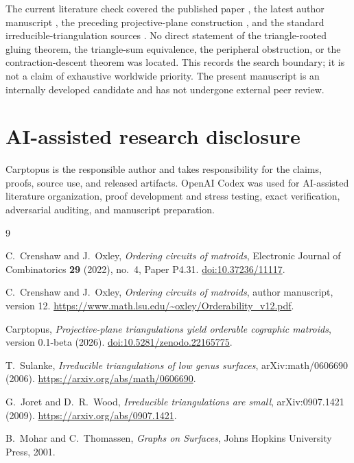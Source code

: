 \documentclass[11pt]{article}
\begin{document}
The current literature check covered the published paper \cite{crenshaw-oxley-published}, the latest
author manuscript \cite{crenshaw-oxley-v12}, the preceding projective-plane construction \cite{carptopus-rp2}, and
the standard irreducible-triangulation sources \cite{sulanke,joret-wood}. No direct statement of
the triangle-rooted gluing theorem, the triangle-sum equivalence, the
peripheral obstruction, or the contraction-descent theorem was located. This
records the search boundary; it is not a claim of exhaustive worldwide
priority. The present manuscript is an internally developed candidate and has
not undergone external peer review.

\Needspace{0.16\textheight}
\section*{AI-assisted research disclosure}


Carptopus is the responsible author and takes responsibility for the claims,
proofs, source use, and released artifacts. OpenAI Codex was used for
AI-assisted literature organization, proof development and stress testing,
exact verification, adversarial auditing, and manuscript preparation.

\begin{thebibliography}{9}
\footnotesize
\raggedright

C.~Crenshaw and J.~Oxley,
\emph{Ordering circuits of matroids},
Electronic Journal of Combinatorics \textbf{29} (2022), no.~4, Paper P4.31.
\href{https://doi.org/10.37236/11117}{doi:10.37236/11117}.

C.~Crenshaw and J.~Oxley,
\emph{Ordering circuits of matroids}, author manuscript, version 12.
\url{https://www.math.lsu.edu/~oxley/Orderability_v12.pdf}.

Carptopus,
\emph{Projective-plane triangulations yield orderable cographic matroids},
version 0.1-beta (2026).
\href{https://doi.org/10.5281/zenodo.22165775}{doi:10.5281/zenodo.22165775}.

T.~Sulanke,
\emph{Irreducible triangulations of low genus surfaces},
arXiv:math/0606690 (2006).
\url{https://arxiv.org/abs/math/0606690}.

G.~Joret and D.~R.~Wood,
\emph{Irreducible triangulations are small},
arXiv:0907.1421 (2009).
\url{https://arxiv.org/abs/0907.1421}.

B.~Mohar and C.~Thomassen,
\emph{Graphs on Surfaces}, Johns Hopkins University Press, 2001.

\end{thebibliography}
\end{document}
